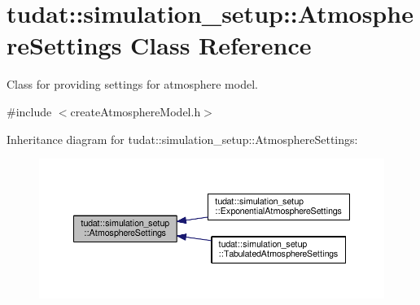 \hypertarget{classtudat_1_1simulation__setup_1_1AtmosphereSettings}{}\section{tudat\+:\+:simulation\+\_\+setup\+:\+:Atmosphere\+Settings Class Reference}
\label{classtudat_1_1simulation__setup_1_1AtmosphereSettings}


Class for providing settings for atmosphere model.  




{\ttfamily \#include $<$create\+Atmosphere\+Model.\+h$>$}



Inheritance diagram for tudat\+:\+:simulation\+\_\+setup\+:\+:Atmosphere\+Settings\+:
\nopagebreak
\begin{figure}[H]
\begin{center}
\leavevmode
\includegraphics[width=350pt]{classtudat_1_1simulation__setup_1_1AtmosphereSettings__inherit__graph}
\end{center}
\end{figure}
